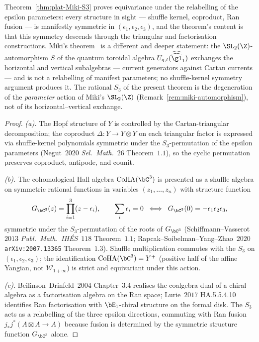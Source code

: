 \begin{remark}
\label{rem:plat-miki-vs-relabelling}
Theorem~\ref{thm:plat-Miki-S3} proves equivariance under the
relabelling of the epsilon parameters: every structure in sight ---
shuffle kernel, coproduct, Ran fusion --- is manifestly symmetric in
$(\epsilon_1,\epsilon_2,\epsilon_3)$, and the theorem's content is
that this symmetry descends through the triangular and factorisation
constructions. Miki's theorem~\cite{Miki07} is a different and deeper
statement: the $\SL_2(\Z)$-automorphism $S$ of the quantum toroidal
algebra $U_{q,t}(\widehat{\widehat{\gl}}_1)$ exchanges the horizontal
and vertical subalgebras --- current generators against Cartan
currents --- and is not a relabelling of manifest parameters; no
shuffle-kernel symmetry argument produces it. The rational $S_3$ of
the present theorem is the degeneration of the \emph{parameter}
action of Miki's $\SL_2(\Z)$
(Remark~\ref{rem:miki-automorphism}), not of its
horizontal--vertical exchange.
\end{remark}

\begin{proof}
\emph{(a).} The Hopf structure of $Y$ is controlled by the
Cartan-triangular decomposition; the coproduct
$\Delta\colon Y\to Y\otimes Y$ on each triangular factor is expressed
via shuffle-kernel polynomials symmetric under the $S_3$-permutation of
the epsilon parameters (Negut~$2020$ \emph{Sel.~Math.}~$26$
Theorem~$1.1$), so the cyclic permutation preserves coproduct, antipode,
and counit.

\emph{(b).} The cohomological Hall algebra
$\mathrm{CoHA}(\bC^3)$ is presented as a shuffle algebra on symmetric
rational functions in variables $(z_1,\ldots,z_n)$ with structure
function
\[
 G_{\bC^3}(z)=\prod_{i=1}^{3}(z-\epsilon_i),\qquad \sum_i\epsilon_i=0
 \;\;\Longleftrightarrow\;\; G_{\bC^3}(0)=-\epsilon_1\epsilon_2\epsilon_3,
\]
symmetric under the $S_3$-permutation of the roots of $G_{\bC^3}$
(Schiffmann--Vasserot~$2013$ \emph{Publ.~Math.~IH\'ES}~$118$
Theorem~$1.1$; Rapcak--Soibelman--Yang--Zhao~$2020$
\texttt{arXiv:2007.13365} Theorem~$1.3$). Shuffle multiplication commutes
with the $S_3$ on $(\epsilon_1,\epsilon_2,\epsilon_3)$; the identification
$\mathrm{CoHA}(\bC^3)=Y^+$ (positive half of the affine Yangian, not
$\mathcal W_{1+\infty}$) is strict and equivariant under this action.

\emph{(c).} Beilinson--Drinfeld~$2004$ Chapter~$3.4$ realises the
coalgebra dual of a chiral algebra as a factorisation algebra on the
Ran space; Lurie~$2017$ HA.5.5.4.10 identifies Ran factorisation with
$\bE_1$-chiral structure on the formal disk. The $S_3$ acts as a
relabelling of the three epsilon directions, commuting with Ran fusion
$j_*j^*(A\boxtimes A\to A)$ because fusion is determined by the
symmetric structure function $G_{\bC^3}$ alone.
\end{proof}

